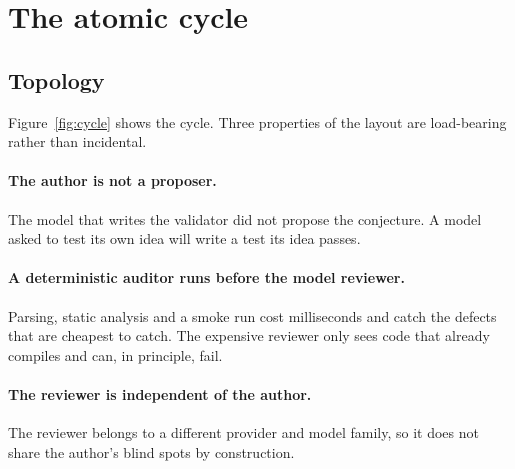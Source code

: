 \documentclass[11pt,a4paper]{article}
\begin{document}
\section{The atomic cycle}

\subsection{Topology}

Figure~\ref{fig:cycle} shows the cycle. Three properties of the layout are
load-bearing rather than incidental.

\paragraph{The author is not a proposer.} The model that writes the validator
did not propose the conjecture. A model asked to test its own idea will write a
test its idea passes.

\paragraph{A deterministic auditor runs before the model reviewer.} Parsing,
static analysis and a smoke run cost milliseconds and catch the defects that are
cheapest to catch. The expensive reviewer only sees code that already compiles
and can, in principle, fail.

\paragraph{The reviewer is independent of the author.} The reviewer belongs to a
different provider and model family, so it does not share the author's blind
spots by construction.
\end{document}
